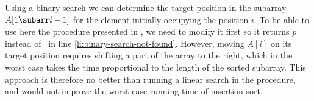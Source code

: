 Using a binary search we can determine the target position in the subarray $A[1\subarr i-1]$ for the element initially occupying the position $i$.
To be able to use here the  procedure presented in , we need to modify it first so it returns $p$ instead of \nil\ in line \ref{li:binary-search-not-found}.
However, moving $A[i]$ on its target position requires shifting a part of the array to the right, which in the worst case takes the time proportional to the length of the sorted subarray.
This approach is therefore no better than running a linear search in the  procedure, and would not improve the worst-case running time of insertion sort.
